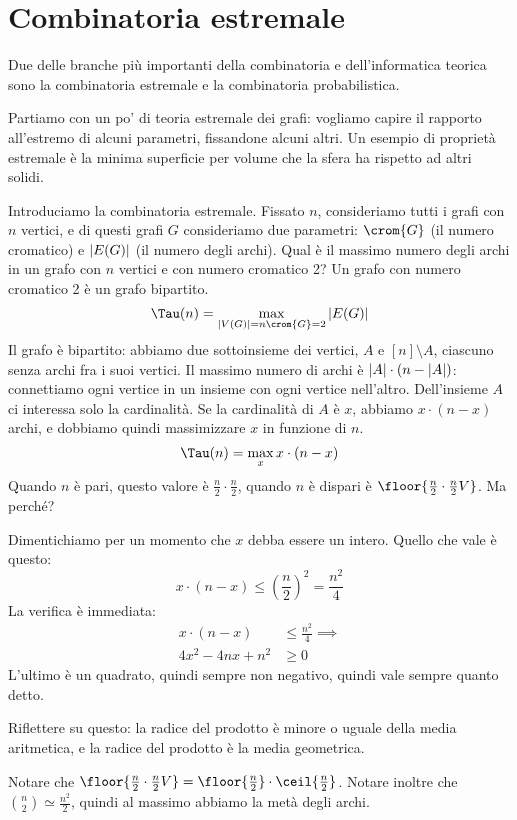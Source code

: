 
\chapter{Combinatoria estremale}

Due delle branche pi\`u importanti della combinatoria e dell'informatica teorica sono la combinatoria estremale e la combinatoria probabilistica.

Partiamo con un po' di teoria estremale dei grafi: vogliamo capire il rapporto all'estremo di alcuni parametri, fissandone alcuni altri.
Un esempio di propriet\`a estremale \`e la minima superficie per volume che la sfera ha rispetto ad altri solidi.

Introduciamo la combinatoria estremale.
Fissato $n$, consideriamo tutti i grafi con $n$ vertici, e di questi grafi $G$ consideriamo due parametri: $\crom{G}$ (il numero cromatico) e $\left\lvert{E(G)}\right\rvert$ (il numero degli archi).
Qual \`e il massimo numero degli archi in un grafo con $n$ vertici e con numero cromatico 2?
Un grafo con numero cromatico 2 \`e un grafo bipartito.
\[
	\Tau(n) = \max_{\abs{V(G)} = n \\ \crom{G} = 2} \abs{E(G)}
\]
Il grafo \`e bipartito: abbiamo due sottoinsieme dei vertici, $A$ e $[n] \setminus A$, ciascuno senza archi fra i suoi vertici.
Il massimo numero di archi \`e $\left\lvert{A}\right\rvert \cdot (n - \left\lvert{A}\right\rvert)$: connettiamo ogni vertice in un insieme con ogni vertice nell'altro.
Dell'insieme $A$ ci interessa solo la cardinalit\`a.
Se la cardinalit\`a di $A$ \`e $x$, abbiamo $x \cdot (n - x)$ archi, e dobbiamo quindi massimizzare $x$ in funzione di $n$.
\[
	\Tau(n) = \max_{x} x \cdot (n - x)
\]
Quando $n$ \`e pari, questo valore \`e $\frac{n}{2} \cdot \frac{n}{2}$, quando $n$ \`e dispari \`e $\floor{\frac{n}{2} \cdot \frac{n}{2}V}$.
Ma perch\'e?

Dimentichiamo per un momento che $x$ debba essere un intero.
Quello che vale \`e questo:
\[
x \cdot (n - x) \le {\left( \frac{n}{2} \right)}^2 = \frac{n^2}{4}
\]
La verifica \`e immediata:
\begin{align*}
	x \cdot (n - x) & \le \frac{n^2}{4} \implies \\
	4 x^2 - 4 n x + n^2 & \ge 0
\end{align*}
L'ultimo \`e un quadrato, quindi sempre non negativo, quindi vale sempre quanto detto.

Riflettere su questo: la radice del prodotto \`e minore o uguale della media aritmetica, e la radice del prodotto \`e la media geometrica.

Notare che $\floor{\frac{n}{2} \cdot \frac{n}{2}V} = \floor{\frac{n}{2}} \cdot \ceil{\frac{n}{2}}$.
Notare inoltre che $\binom{n}{2} \simeq \frac{n^2}{2}$, quindi al massimo abbiamo la met\`a degli archi.

